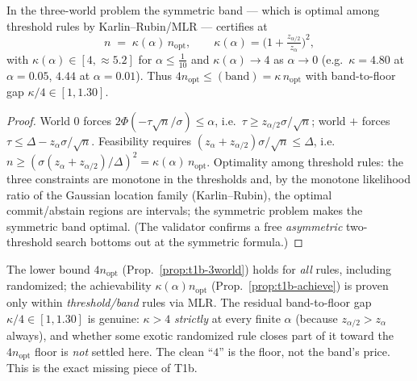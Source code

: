 \begin{proposition}
\label{prop:t1b-achieve}
In the three-world problem the symmetric band --- which is optimal among threshold rules by
Karlin--Rubin/MLR --- certifies at
\[
   n\;=\;\kappa(\alpha)\,n_{\mathrm{opt}},\qquad
   \kappa(\alpha)=\Big(1+\tfrac{z_{\alpha/2}}{z_\alpha}\Big)^2,
\]
with $\kappa(\alpha)\in[4,\approx5.2]$ for $\alpha\le\tfrac1{10}$ and $\kappa(\alpha)\to4$ as
$\alpha\to0$ (e.g.\ $\kappa=4.80$ at $\alpha=0.05$, $4.44$ at $\alpha=0.01$). Thus
$4n_{\mathrm{opt}}\le(\text{band})=\kappa\,n_{\mathrm{opt}}$ with band-to-floor gap
$\kappa/4\in[1,1.30]$.
\end{proposition}

\begin{proof}
World $0$ forces $2\Phi(-\tau\sqrt n/\sigma)\le\alpha$, i.e.\ $\tau\ge z_{\alpha/2}\sigma/\sqrt
n$; world $+$ forces $\tau\le\Delta-z_\alpha\sigma/\sqrt n$. Feasibility requires
$(z_\alpha+z_{\alpha/2})\sigma/\sqrt n\le\Delta$, i.e.\ $n\ge(\sigma(z_\alpha+z_{\alpha/2})/
\Delta)^2=\kappa(\alpha)\,n_{\mathrm{opt}}$. Optimality among threshold rules: the three
constraints are monotone in the thresholds and, by the monotone likelihood ratio of the
Gaussian location family (Karlin--Rubin), the optimal commit/abstain regions are intervals; the
symmetric problem makes the symmetric band optimal. (The validator confirms a free
\emph{asymmetric} two-threshold search bottoms out at the symmetric formula.)
\end{proof}

\begin{remark}\label{rmk:t1b-caveat}
The lower bound $4n_{\mathrm{opt}}$ (Prop.~\ref{prop:t1b-3world}) holds for \emph{all} rules,
including randomized; the achievability $\kappa(\alpha)n_{\mathrm{opt}}$
(Prop.~\ref{prop:t1b-achieve}) is proven only within \emph{threshold/band} rules via MLR. The
residual band-to-floor gap $\kappa/4\in[1,1.30]$ is genuine: $\kappa>4$ \emph{strictly} at every
finite $\alpha$ (because $z_{\alpha/2}>z_\alpha$ always), and whether some exotic randomized rule
closes part of it toward the $4n_{\mathrm{opt}}$ floor is \emph{not} settled here. The clean
``$4$'' is the floor, not the band's price. This is the exact missing piece of T1b.
\end{remark}

